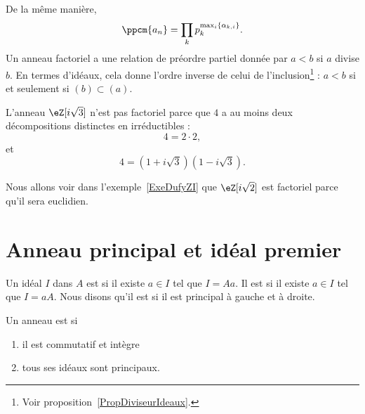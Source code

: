 De la même manière,
\begin{equation}
	\ppcm\{ a_n \}=\prod_kp_k^{\max_i\{ \alpha_{k,i} \}}.
\end{equation}
Un anneau factoriel a une relation de préordre partiel donnée par \( a<b\) si \( a\) divise \( b\). En termes d'idéaux, cela donne l'ordre inverse de celui de l'inclusion\footnote{Voir proposition~\ref{PropDiviseurIdeaux}.} : \( a<b\) si et seulement si \( (b)\subset (a)\).

\begin{example} \label{EXooCWJUooCDJqkr}
	L'anneau \( \eZ[i\sqrt{3}]\) n'est pas factoriel parce que \( 4\) a au moins deux décompositions distinctes en irréductibles :
	\begin{equation}
		4=2\cdot 2,
	\end{equation}
	et
	\begin{equation}
		4=(1+i\sqrt{3})(1-i\sqrt{3}).
	\end{equation}
\end{example}

Nous allons voir dans l'exemple~\ref{ExeDufyZI} que \( \eZ[i\sqrt{2}]\) est factoriel parce qu'il sera euclidien.

\section{Anneau principal et idéal premier}

\begin{definition}      \label{DEFooMZRKooBPLAWH}
	Un idéal \( I\) dans \( A\) est  si il existe \( a\in I\) tel que \( I= A a\). Il est  si il existe \( a\in I\) tel que \( I=a A\). Nous disons qu'il est  si il est principal à gauche et à droite.
\end{definition}

\begin{definition}          \label{DEFooGWOZooXzUlhK}
	Un anneau est  si
	\begin{enumerate}
		\item
		      il est commutatif et intègre
		\item
		      tous ses idéaux sont principaux.
	\end{enumerate}
\end{definition}

